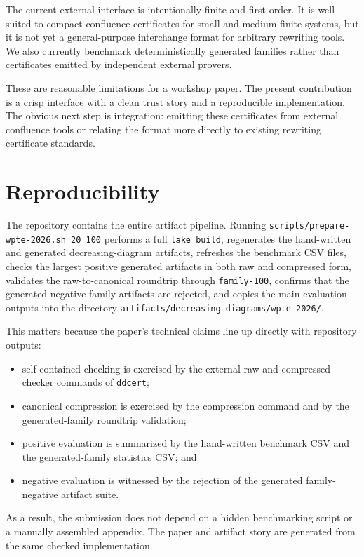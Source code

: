 \documentclass[submission,copyright,creativecommons]{eptcs}
\newcommand{\ddcert}{\texttt{ddcert}\xspace}
\newcommand{\family}[1]{\texttt{family-#1}}
\begin{document}
The current external interface is intentionally finite and first-order. It is
well suited to compact confluence certificates for small and medium finite
systems, but it is not yet a general-purpose interchange format for arbitrary
rewriting tools. We also currently benchmark deterministically generated
families rather than certificates emitted by independent external provers.

These are reasonable limitations for a workshop paper. The present contribution
is a crisp interface with a clean trust story and a reproducible implementation.
The obvious next step is integration: emitting these certificates from external
confluence tools or relating the format more directly to existing rewriting
certificate standards.

\section{Reproducibility}

The repository contains the entire artifact pipeline. Running
\texttt{scripts/prepare-wpte-2026.sh 20 100} performs a full
\texttt{lake build}, regenerates the hand-written and generated decreasing-diagram
artifacts, refreshes the benchmark CSV files, checks the largest positive
generated artifacts in both raw and compressed form, validates the
raw-to-canonical roundtrip through \family{100}, confirms that the generated
negative family artifacts are rejected, and copies the main evaluation outputs
into the directory \texttt{artifacts/decreasing-diagrams/wpte-2026/}.

This matters because the paper's technical claims line up directly with
repository outputs:
\begin{itemize}
\item self-contained checking is exercised by the external raw and compressed
  checker commands of \ddcert;
\item canonical compression is exercised by the compression command and by the
  generated-family roundtrip validation;
\item positive evaluation is summarized by the hand-written benchmark CSV and
  the generated-family statistics CSV; and
\item negative evaluation is witnessed by the rejection of the generated
  family-negative artifact suite.
\end{itemize}
As a result, the submission does not depend on a hidden benchmarking script or a
manually assembled appendix. The paper and artifact story are generated from the
same checked implementation.
\end{document}
